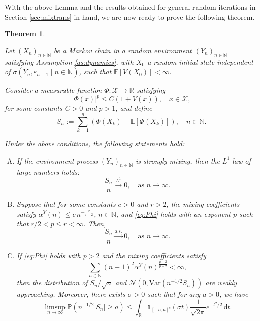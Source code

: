 \documentclass[a4paper,10pt]{article}
\newtheorem{theorem}{Theorem}[section]
\newcommand{\N}{\mathbb{N}}
\newcommand{\R}{\mathbb{R}}
\newcommand{\X}{\mathcal{X}}
\renewcommand{\P}{\mathbb{P}}
\newcommand{\E}{\mathbb{E}}
\newcommand{\ind}{\mathds{1}}
\newcommand{\var}{\mathrm{Var}}
\newcommand{\dint}{\mathrm{d}}  %
\begin{document}
With the above Lemma and the results obtained for general random iterations in Section \ref{sec:mixtrans} in hand, we are now ready to prove the following theorem.
\begin{theorem}\label{thm:MCRE_LLN_and_weakapproaching}

	Let $(X_n)_{n \in \N}$ be a Markov chain in a random environment $(Y_n)_{n \in \N}$ satisfying Assumption \ref{as:dynamics}, with $X_0$ a random initial state independent of $\sigma(Y_n, \varepsilon_{n+1} \mid n \in \N)$, such that $\E[V(X_0)] < \infty$.
	
	Consider a measurable function $\Phi: \X \to \R$ satisfying
	\begin{equation}\label{eq:Phi}
		|\Phi(x)|^p \le C(1 + V(x)), \quad x \in \X,
	\end{equation}
	for some constants $C > 0$ and $p > 1$, and define
	$$
	S_n := \sum_{k=1}^n \left( \Phi(X_k) -  \E[\Phi(X_k)]\right), \quad n \in \N.
	$$
	
	\medskip
	\noindent
	Under the above conditions, the following statements hold:
	\begin{enumerate}[A)]
		\item If the environment process $(Y_n)_{n \in \N}$ is strongly mixing, then the $L^1$ law of large numbers holds:
		$$
		\frac{S_n}{n} \stackrel{L^1}{\to} 0, \quad \text{as } n \to \infty.
		$$
		
		\item Suppose that for some constants $c > 0$ and $r > 2$, the mixing coefficients satisfy $\alpha^Y(n) \le c\, n^{-\frac{r}{r-2}}$, $n \in \N$, and \eqref{eq:Phi} holds with an exponent $p$ such that $r/2 < p \le r < \infty$. Then,
		$$
		\frac{S_n}{n} \stackrel{\text{a.s.}}{\to} 0, \quad \text{as } n \to \infty.
		$$
		
		\item If \eqref{eq:Phi} holds with $p > 2$ and the mixing coefficients satisfy
		\begin{equation}\label{eq:mix_decrease}
			\sum_{n \in \N} (n+1)^2 \alpha^Y(n)^{\frac{p-2}{p+2}} < \infty,
		\end{equation}
		then the distribution of $S_n/\sqrt{n}$ and $\mathcal{N}(0, \var(n^{-1/2}S_n))$ are weakly approaching. Moreover, there exists $\sigma>0$ such that for any $a > 0$, we have
		$$
		\limsup_{n \to \infty} \P\left(n^{-1/2}|S_n| \ge a\right) \le \int_{\R} \ind_{[-a,a]^c}(\sigma t) \frac{1}{\sqrt{2\pi}} e^{-t^2/2} \, \dint t.
		$$
	\end{enumerate}
\end{theorem}
\end{document}
